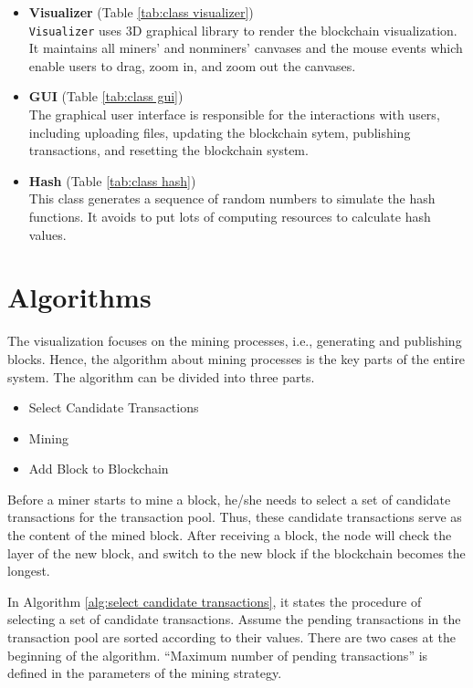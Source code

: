 \begin{itemize}
    \item \textbf{Visualizer} (Table \ref{tab:class visualizer}) \\
        \texttt{Visualizer} uses 3D graphical library to render the blockchain visualization. It maintains all miners' and nonminers' canvases and the mouse events which enable users to drag, zoom in, and zoom out the canvases.
    \item \textbf{GUI} (Table \ref{tab:class gui}) \\
        The graphical user interface is responsible for the interactions with users, including uploading files, updating the blockchain sytem, publishing transactions, and resetting the blockchain system.
    \item \textbf{Hash} (Table \ref{tab:class hash}) \\
        This class generates a sequence of random numbers to simulate the hash functions. It avoids to put lots of computing resources to calculate hash values.
\end{itemize}

\section{Algorithms}
\label{sec:algorithms}

The visualization focuses on the mining processes, i.e., generating and publishing blocks. Hence, the algorithm about mining processes is the key parts of the entire system. The algorithm can be divided into three parts.

\begin{itemize}
    \item Select Candidate Transactions
    \item Mining
    \item Add Block to Blockchain
\end{itemize}

Before a miner starts to mine a block, he/she needs to select a set of candidate transactions for the transaction pool. Thus, these candidate transactions serve as the content of the mined block. After receiving a block, the node will check the layer of the new block, and switch to the new block if the blockchain becomes the longest.

In Algorithm \ref{alg:select candidate transactions}, it states the procedure of selecting a set of candidate transactions. Assume the pending transactions in the transaction pool are sorted according to their values. There are two cases at the beginning of the algorithm. ``Maximum number of pending transactions'' is defined in the parameters of the mining strategy.

